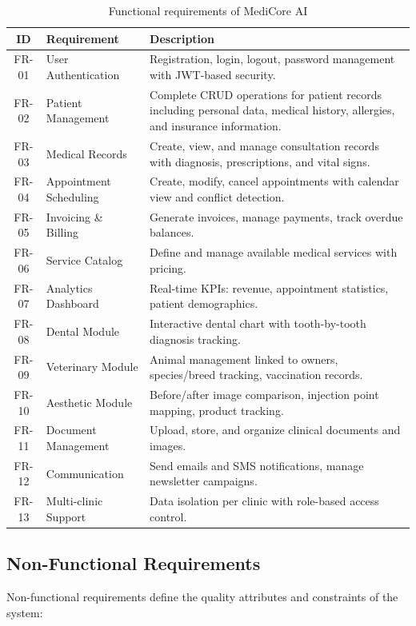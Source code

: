 \documentclass[12pt,a4paper,oneside]{report}
\begin{document}
\begin{table}[H]
\centering
\caption{Functional requirements of MediCore AI}
\label{tab:functional_req}
\begin{tabular}{|c|p{4.5cm}|p{7.5cm}|}
\hline
\textbf{ID} & \textbf{Requirement} & \textbf{Description} \\
\hline
FR-01 & User Authentication & Registration, login, logout, password management with JWT-based security. \\
\hline
FR-02 & Patient Management & Complete CRUD operations for patient records including personal data, medical history, allergies, and insurance information. \\
\hline
FR-03 & Medical Records & Create, view, and manage consultation records with diagnosis, prescriptions, and vital signs. \\
\hline
FR-04 & Appointment Scheduling & Create, modify, cancel appointments with calendar view and conflict detection. \\
\hline
FR-05 & Invoicing \& Billing & Generate invoices, manage payments, track overdue balances. \\
\hline
FR-06 & Service Catalog & Define and manage available medical services with pricing. \\
\hline
FR-07 & Analytics Dashboard & Real-time KPIs: revenue, appointment statistics, patient demographics. \\
\hline
FR-08 & Dental Module & Interactive dental chart with tooth-by-tooth diagnosis tracking. \\
\hline
FR-09 & Veterinary Module & Animal management linked to owners, species/breed tracking, vaccination records. \\
\hline
FR-10 & Aesthetic Module & Before/after image comparison, injection point mapping, product tracking. \\
\hline
FR-11 & Document Management & Upload, store, and organize clinical documents and images. \\
\hline
FR-12 & Communication & Send emails and SMS notifications, manage newsletter campaigns. \\
\hline
FR-13 & Multi-clinic Support & Data isolation per clinic with role-based access control. \\
\hline
\end{tabular}
\end{table}

\subsection{Non-Functional Requirements}
Non-functional requirements define the quality attributes and constraints of the system:
\end{document}
